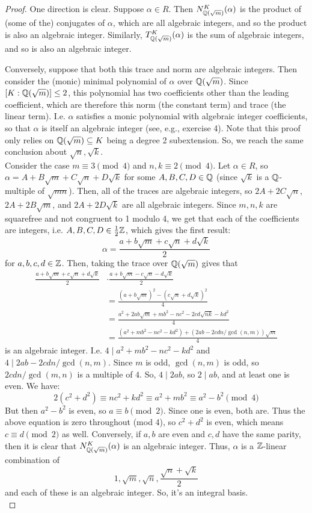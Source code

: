 \begin{proof} 
    One direction is clear. Suppose $\alpha \in R$. Then $N_{\mathbb{Q}(\sqrt{m})}^K(\alpha)$ is the product of (some of the) conjugates of $\alpha$, which are all algebraic integers, and so the product is also an algebraic integer. Similarly, $T_{\mathbb{Q}(\sqrt{m})}^K(\alpha)$ is the sum of algebraic integers, and so is also an algebraic integer.

    Conversely, suppose that both this trace and norm are algebraic integers. Then consider the (monic) minimal polynomial of $\alpha$ over $\mathbb{Q}(\sqrt{m})$. Since $[K:\mathbb{Q}(\sqrt{m})] \leq 2$, this polynomial has two coefficients other than the leading coefficient, which are therefore this norm (the constant term) and trace (the linear term). I.e. $\alpha$ satisfies a monic polynomial with algebraic integer coefficients, so that $\alpha$ is itself an algebraic integer (see, e.g., exercise 4). Note that this proof only relies on $\mathbb{Q}(\sqrt{m}) \subseteq K$ being a degree 2 subextension. So, we reach the same conclusion about $\sqrt{n},\sqrt{k}$. \\
    
    Consider the case $m \equiv 3 \pmod{4}$ and $n,k \equiv 2 \pmod{4}$. Let $\alpha \in R$, so $\alpha = A+B\sqrt{m}+C\sqrt{n}+D\sqrt{k}$ for some $A,B,C,D \in \mathbb{Q}$ (since $\sqrt{k}$ is a $\mathbb{Q}$-multiple of $\sqrt{mn}$). Then, all of the traces are algebraic integers, so $2A+2C\sqrt{n}$, $2A+2B\sqrt{m}$, and $2A+2D\sqrt{k}$ are all algebraic integers. Since $m,n,k$ are squarefree and not congruent to 1 modulo 4, we get that each of the coefficients are integers, i.e. $A,B,C,D \in \frac12\mathbb{Z}$, which gives the first result:
    \[ \alpha = \frac{a+b\sqrt{m}+c\sqrt{n}+d\sqrt{k}}{2} \]
    for $a,b,c,d \in \mathbb{Z}$. Then, taking the trace over $\mathbb{Q}(\sqrt{m})$ gives that
    \begin{align*}
    \frac{a+b\sqrt{m}+c\sqrt{n}+d\sqrt{k}}{2} &\cdot \frac{a+b\sqrt{m}-c\sqrt{n}-d\sqrt{k}}{2} \\
        &= \frac{(a+b\sqrt{m})^2-(c\sqrt{n}+d\sqrt{k})^2}{4} \\
        &= \frac{a^2+2ab\sqrt{m}+mb^2-nc^2-2cd\sqrt{nk}-kd^2}{4} \\
        &= \frac{(a^2+mb^2-nc^2-kd^2)+(2ab-2cdn/\gcd(n,m))\sqrt{m}}{4}
    \end{align*}
    is an algebraic integer. I.e. $4 \mid a^2+mb^2-nc^2-kd^2$ and $4 \mid 2ab-2cdn/\gcd(n,m)$. Since $m$ is odd, $\gcd(n,m)$ is odd, so $2cdn/\gcd(m,n)$ is a multiple of $4$. So, $4 \mid 2ab$, so $2 \mid ab$, and at least one is even. We have:
    \[ 2(c^2+d^2) \equiv nc^2+kd^2 \equiv a^2+mb^2 \equiv a^2-b^2 \pmod{4} \]
    But then $a^2-b^2$ is even, so $a \equiv b \pmod{2}$. Since one is even, both are. Thus the above equation is zero throughout (mod 4), so $c^2+d^2$ is even, which means $c \equiv d \pmod{2}$ as well. Conversely, if $a,b$ are even and $c,d$ have the same parity, then it is clear that $N_{\mathbb{Q}(\sqrt{m})}^K(\alpha)$ is an algebraic integer. Thus, $\alpha$ is a $\mathbb{Z}$-linear combination of
    \[ 1,\sqrt{m},\sqrt{n},\frac{\sqrt{n}+\sqrt{k}}{2} \]
    and each of these is an algebraic integer. So, it's an integral basis. \\


\end{proof}
